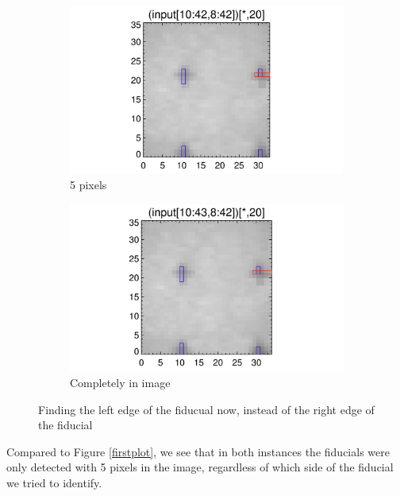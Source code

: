 \documentclass[10pt]{article}
\begin{document}
\begin{figure}[!h]
    \begin{subfigure}[b]{.45\linewidth}
        \centering
        \includegraphics[width=1.3\textwidth]{plots_tables_images/fidcheck_newdegree4.png}
        \caption{5 pixels}
    \end{subfigure}
    \begin{subfigure}[b]{.45\linewidth}
        \centering
        \includegraphics[width=1.3\textwidth]{plots_tables_images/fidcheck_newdegree5.png}
        \caption{Completely in image}
    \end{subfigure}
    \caption{Finding the left edge of the fiducual now, instead of the right edge of the fiducial}
    \label{isitok}
\end{figure}

Compared to Figure \ref{firstplot}, we see that in both instances the fiducials were only detected with 5 pixels in the image, regardless of which side of the fiducial we tried to identify.



\end{document}
